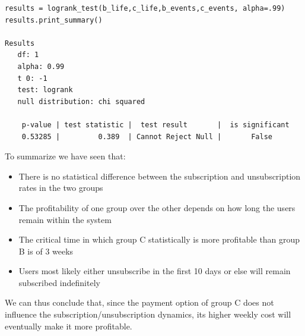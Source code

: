 \documentclass[paper=a4, fontsize=10pt]{report}
\begin{document}
\scriptsize
\begin{lstlisting}[frame=single,caption=LogRank test \label{code:python_logRank}]
results = logrank_test(b_life,c_life,b_events,c_events, alpha=.99)
results.print_summary()

Results
   df: 1
   alpha: 0.99
   t 0: -1
   test: logrank
   null distribution: chi squared

    p-value | test statistic |  test result       |  is significant
    0.53285 |         0.389  | Cannot Reject Null |       False       

\end{lstlisting}

\normalsize
To summarize we have seen that:
\begin{itemize}
 \item There is no statistical difference between the subscription and unsubscription rates in the two groups
 \item The profitability of one group over the other depends on how long the users remain within the system
 \item The critical time in which group C statistically is more profitable than group B is of 3 weeks
 \item Users most likely either unsubscribe in the first 10 days or else will remain subscribed indefinitely
\end{itemize}

We can thus conclude that, since the payment option of group C does not influence the subscription/unsubscription dynamics, its
higher weekly cost will eventually make it more profitable.
\end{document}
